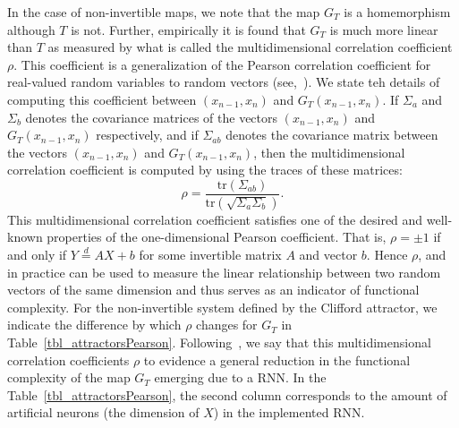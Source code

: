 In the case of non-invertible maps, we note that the map $G_T$ is a homemorphism although $T$ is not. Further, empirically it is found that $G_T$ is much more linear than $T$ as measured by what is called the multidimensional correlation coefficient $\rho$. This coefficient is a generalization of the Pearson correlation coefficient for real-valued random variables to random vectors (see,~\cite{puccetti2019measuring}). We state teh details of computing this coefficient between 
$(x_{n-1},x_n)$ and $G_T(x_{n-1},x_n)$. 
If $\Sigma_{a}$ and $\Sigma_{b}$ denotes the covariance matrices of the vectors $(x_{n-1},x_n)$ and $G_T(x_{n-1},x_n)$ respectively, and if $\Sigma_{ab}$ denotes the covariance matrix between the vectors $(x_{n-1},x_n)$ and $G_T(x_{n-1},x_n)$, then the multidimensional correlation coefficient is computed by using the traces of these matrices:
\[
    \rho= \frac{\text{tr}({\Sigma_{ab}})}{\text{tr}({\sqrt{\Sigma_a\Sigma_b}})}.
\]
This multidimensional correlation coefficient satisfies one of the desired and well-known properties of the one-dimensional Pearson coefficient. That is, $\rho=\pm 1$ if and only if $Y\overset{d}{=}AX+b$ for some invertible matrix $A$ and vector $b$. Hence $\rho$, and in practice can be used  to measure the linear relationship between two random vectors of the same dimension and thus serves as an indicator of functional complexity. For the non-invertible system defined by the Clifford attractor, we indicate the difference by which $\rho$ changes for $G_T$ in Table~\ref{tbl_attractorsPearson}.
Following~\cite{manjunath2021universal}, we say that this multidimensional correlation coefficients $\rho$ to evidence a general reduction in the functional complexity of the map $G_T$ emerging due to a RNN. In the 
Table~\ref{tbl_attractorsPearson}, the second column corresponds to the amount of artificial neurons (the dimension of $X$) in the implemented RNN.
               
